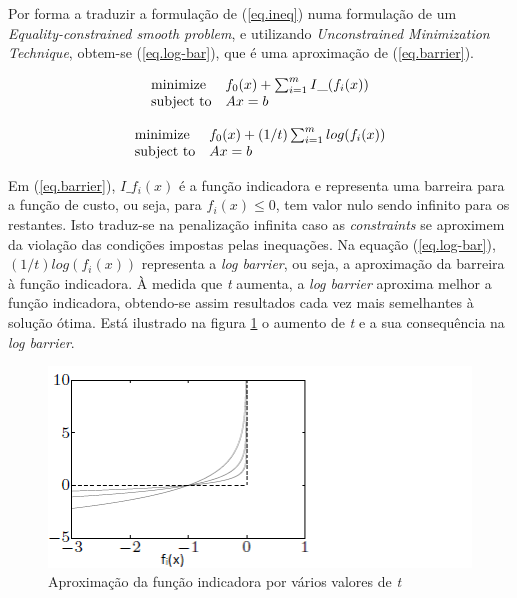 \documentclass[a4paper]{IEEEtran}
\begin{document}
Por forma a traduzir a formulação de (\ref{eq.ineq}) numa formulação de um \textit{Equality-constrained smooth problem}, e utilizando \textit{Unconstrained Minimization Technique}, obtem-se (\ref{eq.log-bar}), que é uma aproximação de (\ref{eq.barrier}).

\begin{equation}
\label{eq.barrier}
\begin{array}[t]{ll} \text{minimize} & f_0(x) + \sum_{i=1}^{m} I\_(f_i(x)) \\
\text{subject to} &  Ax=b \end{array}
\end{equation}

\begin{equation}
\label{eq.log-bar}
\begin{array}[t]{ll} \text{minimize} & f_0(x) + (1/t) \sum_{i=1}^{m} log(f_i(x)) \\
\text{subject to} &  Ax=b \end{array}
\end{equation}

Em (\ref{eq.barrier}), $I\_f_i(x)$ é a função indicadora e representa uma barreira para a função de custo, ou seja, para $f_i(x) \leq 0$, tem valor nulo sendo infinito para os restantes. Isto traduz-se na penalização infinita caso as \textit{constraints} se aproximem da violação das condições impostas pelas inequações. Na equação (\ref{eq.log-bar}), $(1/t) log(f_i(x))$ representa a \textit{log barrier}, ou seja, a aproximação da barreira à função indicadora. À medida que \textit{t} aumenta, a \textit{log barrier} aproxima melhor a função indicadora, obtendo-se assim resultados cada vez mais semelhantes à solução ótima. Está ilustrado na figura \ref{fig:barrier} o aumento de \textit{t} e a sua consequência na \textit{log barrier}.

\begin{figure}[htp]
  \centering
  \captionsetup{font=scriptsize} 
  \includegraphics[width=0.9\columnwidth]{./log-barrier}
  \caption{Aproximação da função indicadora por vários valores de \textit{t}}
  \label{fig:barrier}
\end{figure}
\end{document}
